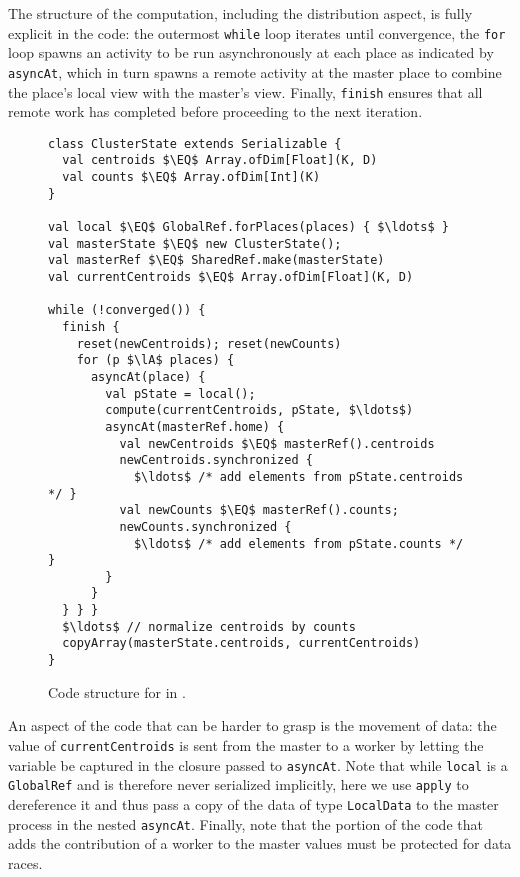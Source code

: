 The structure of the computation, including the distribution
aspect, is fully explicit in the code: the outermost \lstinline{while} loop
iterates until convergence, the \lstinline{for} loop spawns an activity to be run asynchronously at each place as indicated by \lstinline{asyncAt}, which in turn spawns a remote activity at the master place to combine the place's local view with the master's view.
Finally, \lstinline{finish} ensures that all remote work has completed before
proceeding to the next iteration.
\begin{figure}
\begin{lstlisting}
class ClusterState extends Serializable {
  val centroids $\EQ$ Array.ofDim[Float](K, D)
  val counts $\EQ$ Array.ofDim[Int](K)
}

val local $\EQ$ GlobalRef.forPlaces(places) { $\ldots$ }
val masterState $\EQ$ new ClusterState();
val masterRef $\EQ$ SharedRef.make(masterState)
val currentCentroids $\EQ$ Array.ofDim[Float](K, D)

while (!converged()) {
  finish {
    reset(newCentroids); reset(newCounts)
    for (p $\lA$ places) {
      asyncAt(place) {
        val pState = local();
        compute(currentCentroids, pState, $\ldots$)
        asyncAt(masterRef.home) {
          val newCentroids $\EQ$ masterRef().centroids
          newCentroids.synchronized {
            $\ldots$ /* add elements from pState.centroids */ }
          val newCounts $\EQ$ masterRef().counts;
          newCounts.synchronized {
            $\ldots$ /* add elements from pState.counts */ }
        }
      }
  } } }
  $\ldots$ // normalize centroids by counts
  copyArray(masterState.centroids, currentCentroids)
}
\end{lstlisting}
\caption{Code structure for \kmeans in \apgas.\label{fig:kmeansapgas}}
\end{figure}
An aspect of the code that can be harder to grasp is the movement of data: the
value of \lstinline{currentCentroids} is sent from the master to a worker by letting the variable be captured in the closure passed to \lstinline{asyncAt}.
Note that while \lstinline{local} is a
\lstinline{GlobalRef} and is therefore never serialized implicitly, here we use
\lstinline{apply} to dereference it and thus pass a copy of the data of type
\lstinline{LocalData} to the master process in the nested \lstinline{asyncAt}.
Finally, note that the portion of
the code that adds the contribution of a worker to the master values must be
protected for data races.


